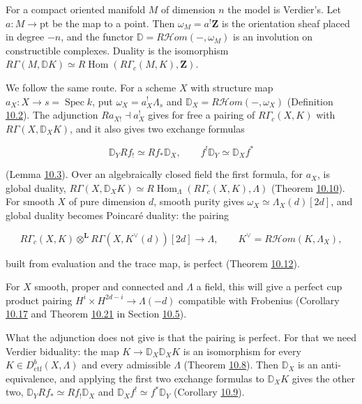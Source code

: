 \documentclass[11pt]{article}
\providecommand{\cHom}{}\renewcommand{\cHom}{R\mathcal{H}\!om}
\begin{document}
For a compact oriented manifold \(M\) of dimension \(n\) the model is Verdier's. Let \(a:M\to\mathrm{pt}\) be the map to a point. Then \(\omega_M=a^!\mathbf Z\) is the orientation sheaf placed in degree \(-n\), and the functor \(\mathbb D=\cHom(-,\omega_M)\) is an involution on constructible complexes. Duality is the isomorphism \(R\Gamma(M,\mathbb DK)\simeq R\!\operatorname{Hom}(R\Gamma_c(M,K),\mathbf Z)\).

We follow the same route. For a scheme \(X\) with structure map \(a_X:X\to s=\operatorname{Spec}k\), put \(\omega_X=a_X^!\Lambda_s\) and \(\mathbb D_X=\cHom(-,\omega_X)\) (Definition \hyperref[bp108]{10.2}). The adjunction \(Ra_{X!}\dashv a_X^!\) gives for free a pairing of \(R\Gamma_c(X,K)\) with \(R\Gamma(X,\mathbb D_XK)\), and it also gives two exchange formulas

\[
\mathbb D_YRf_!\simeq Rf_*\mathbb D_X,\qquad
f^!\mathbb D_Y\simeq\mathbb D_Xf^*
\]

(Lemma \hyperref[bp110]{10.3}). Over an algebraically closed field the first formula, for \(a_X\), is global duality, \(R\Gamma(X,\mathbb D_XK)\simeq R\!\operatorname{Hom}_\Lambda(R\Gamma_c(X,K),\Lambda)\) (Theorem \hyperref[bp132]{10.10}). For smooth \(X\) of pure dimension \(d\), smooth purity gives \(\omega_X\simeq\Lambda_X(d)[2d]\), and global duality becomes Poincaré duality: the pairing

\[
R\Gamma_c(X,K)\otimes^{\mathbf L}R\Gamma(X,K^\vee(d))[2d]
\longrightarrow\Lambda,\qquad K^\vee=\cHom(K,\Lambda_X),
\]

built from evaluation and the trace map, is perfect (Theorem \hyperref[bp137]{10.12}).

For \(X\) smooth, proper and connected and \(\Lambda\) a field, this will give a perfect cup product pairing \(H^i\times H^{2d-i}\to\Lambda(-d)\) compatible with Frobenius (Corollary \hyperref[bp152]{10.17} and Theorem \hyperref[bp165]{10.21} in Section \hyperref[bp154]{10.5}).

What the adjunction does not give is that the pairing is perfect. For that we need Verdier biduality: the map \(K\to\mathbb D_X\mathbb D_XK\) is an isomorphism for every \(K\in D^b_{\mathrm{ctf}}(X,\Lambda)\) and every admissible \(\Lambda\) (Theorem \hyperref[bp125]{10.8}). Then \(\mathbb D_X\) is an anti-equivalence, and applying the first two exchange formulas to \(\mathbb D_XK\) gives the other two, \(\mathbb D_YRf_*\simeq Rf_!\mathbb D_X\) and \(\mathbb D_Xf^!\simeq f^*\mathbb D_Y\) (Corollary \hyperref[bp128]{10.9}).
\end{document}
